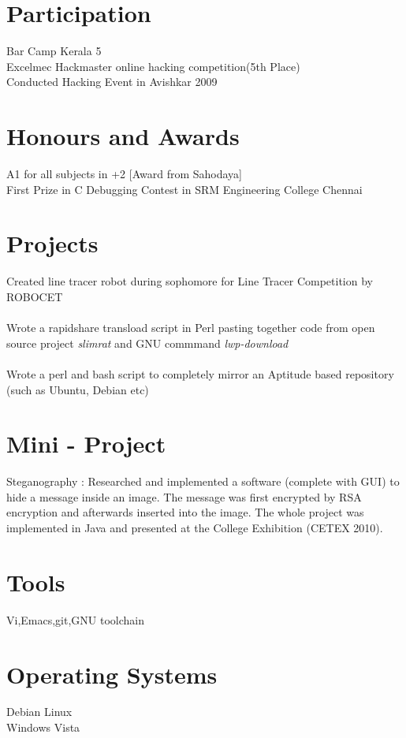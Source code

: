 \documentclass[line,margin]{res}
\begin{document}
\begin{resume}
\section{Participation}
Bar Camp Kerala 5\\
Excelmec Hackmaster online hacking competition(5th Place)\\
Conducted Hacking Event in Avishkar 2009\\


\section{Honours and Awards}
A1 for all subjects in +2  [Award from Sahodaya]\\
First Prize in C Debugging Contest in SRM Engineering College Chennai

\section{Projects}
Created line tracer robot during sophomore for Line Tracer Competition by ROBOCET\\\\
Wrote a rapidshare transload script in Perl pasting together code from open source project {\it slimrat} and GNU commmand {\it lwp-download}\\\\
Wrote a perl and bash script to completely mirror an Aptitude based repository (such as Ubuntu, Debian etc)

\section{Mini - Project}
Steganography : Researched and implemented a software (complete with GUI) to hide a message inside an image. The message was first encrypted by RSA encryption and afterwards inserted into the image. The whole project was implemented in Java and presented at the College Exhibition (CETEX 2010).

\section{Tools}
Vi,Emacs,git,GNU toolchain

\section{Operating Systems}
Debian Linux\\
Windows Vista\\


\end{resume}
\end{document}
